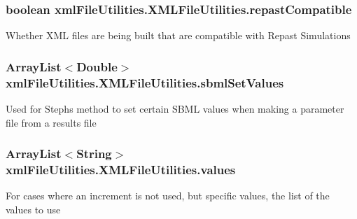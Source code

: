 \subsubsection[{repast\+Compatible}]{\setlength{\rightskip}{0pt plus 5cm}boolean xml\+File\+Utilities.\+X\+M\+L\+File\+Utilities.\+repast\+Compatible\hspace{0.3cm}{\ttfamily [static]}}\label{classxmlFileUtilities_1_1XMLFileUtilities_ac1cd9779fc740585e585498ab598a573}
Whether X\+M\+L files are being built that are compatible with Repast Simulations \hypertarget{classxmlFileUtilities_1_1XMLFileUtilities_a74e7bbbaf59c27ca16b4d2696b1a7a57}{}
\subsubsection[{sbml\+Set\+Values}]{\setlength{\rightskip}{0pt plus 5cm}Array\+List$<$Double$>$ xml\+File\+Utilities.\+X\+M\+L\+File\+Utilities.\+sbml\+Set\+Values\hspace{0.3cm}{\ttfamily [static]}}\label{classxmlFileUtilities_1_1XMLFileUtilities_a74e7bbbaf59c27ca16b4d2696b1a7a57}
Used for Steph\textquotesingle{}s method to set certain S\+B\+M\+L values when making a parameter file from a results file \hypertarget{classxmlFileUtilities_1_1XMLFileUtilities_af7660bd6cf5d1988e53ebdacfda88565}{}
\subsubsection[{values}]{\setlength{\rightskip}{0pt plus 5cm}Array\+List$<$String$>$ xml\+File\+Utilities.\+X\+M\+L\+File\+Utilities.\+values\hspace{0.3cm}{\ttfamily [static]}}\label{classxmlFileUtilities_1_1XMLFileUtilities_af7660bd6cf5d1988e53ebdacfda88565}
For cases where an increment is not used, but specific values, the list of the values to use \hypertarget{classxmlFileUtilities_1_1XMLFileUtilities_a936db354ec5ded79b915e60aa81ef757}{}
